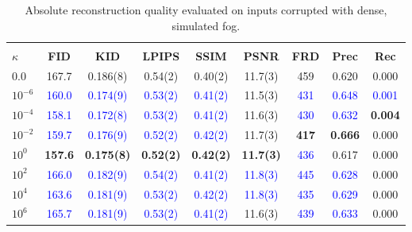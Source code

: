 \documentclass[twoside,11pt]{article}
\begin{document}
\begin{table}[ht!]
\centering
\renewcommand{\arraystretch}{1.4}
\setlength{\tabcolsep}{6pt}
\small
\begin{tabular}{lcccccccc}
\toprule
\rowcolor{gray!20}
\multicolumn{9}{c}{\textbf{Simulated Fog - Absolute Scores}} \\
\textbf{$\kappa$} & \textbf{FID} & \textbf{KID} & \textbf{LPIPS} & \textbf{SSIM} & \textbf{PSNR} & \textbf{FRD} & \textbf{Prec} & \textbf{Rec} \\
\midrule
$0.0$        & 167.7 & 0.186(8) & 0.54(2) & 0.40(2) & 11.7(3) & 459 & 0.620 & 0.000 \\
$10^{-6}$    & \textcolor{blue}{160.0} & \textcolor{blue}{0.174(9)} & \textcolor{blue}{0.53(2)} & \textcolor{blue}{0.41(2)} & 11.5(3) & \textcolor{blue}{431} & \textcolor{blue}{0.648} & \textcolor{blue}{0.001}  \\
$10^{-4}$    & \textcolor{blue}{158.1} & \textcolor{blue}{0.172(8)} & \textcolor{blue}{0.53(2)} & \textcolor{blue}{0.41(2)} & 11.6(3) & \textcolor{blue}{430} & \textcolor{blue}{0.632} & \textbf{\textcolor{green!50!black}{0.004}} \\
$10^{-2}$    & \textcolor{blue}{159.7} & \textcolor{blue}{0.176(9)} & \textcolor{blue}{0.52(2)} & \textcolor{blue}{0.42(2)} & 11.7(3) & \textbf{\textcolor{green!50!black}{417}} & \textbf{\textcolor{green!50!black}{0.666}} & 0.000 \\
$10^{0}$     & \textbf{\textcolor{green!50!black}{157.6}} & \textbf{\textcolor{green!50!black}{0.175(8)}} & \textbf{\textcolor{green!50!black}{0.52(2)}} & \textbf{\textcolor{green!50!black}{0.42(2)}} & \textbf{\textcolor{green!50!black}{11.7(3)}} & \textcolor{blue}{436} & 0.617 & 0.000 \\
$10^{2}$     & \textcolor{blue}{166.0} & \textcolor{blue}{0.182(9)} & \textcolor{blue}{0.54(2)} & \textcolor{blue}{0.41(2)} & \textcolor{blue}{11.8(3)} & \textcolor{blue}{445} & \textcolor{blue}{0.628} & 0.000 \\
$10^{4}$     & \textcolor{blue}{163.6} & \textcolor{blue}{0.181(9)} & \textcolor{blue}{0.53(2)} & \textcolor{blue}{0.42(2)} & \textcolor{blue}{11.8(3)} & \textcolor{blue}{435} & \textcolor{blue}{0.629} & 0.000 \\
$10^{6}$     & \textcolor{blue}{165.7} & \textcolor{blue}{0.181(9)} & \textcolor{blue}{0.53(2)} & \textcolor{blue}{0.41(2)} & 11.6(3) & \textcolor{blue}{439} & \textcolor{blue}{0.633} & 0.000 \\
\bottomrule
\end{tabular}
\caption{Absolute reconstruction quality evaluated on inputs corrupted with dense, simulated fog.}
\label{tab:robustness_fog_abs}
\end{table}
\end{document}
